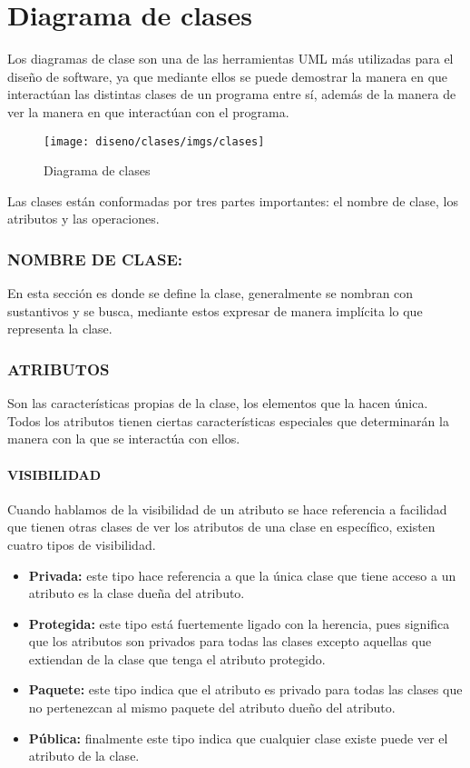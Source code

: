 \chapter{Diagrama de clases}
Los diagramas de clase son una de las herramientas UML más utilizadas para el diseño de software, ya que mediante ellos se puede demostrar la manera en que interactúan las distintas clases de un programa entre sí, además de la manera de ver la manera en que interactúan con el programa.
\begin{figure}[h!]
	\centering
	\texttt{[image: diseno/clases/imgs/clases]}
	\caption{Diagrama de clases}
\end{figure}
Las clases están conformadas por tres partes importantes: el nombre de clase, los atributos y las operaciones.

\subsection{NOMBRE DE CLASE:}
En esta sección es donde se define la clase, generalmente se nombran con sustantivos y se busca, mediante estos expresar de manera implícita lo que representa la clase.
  
\subsection{ATRIBUTOS}
Son las características propias de la clase, los elementos que la hacen única. Todos los atributos tienen ciertas características especiales que determinarán la manera con la que se interactúa con ellos.

\subsubsection{VISIBILIDAD}
Cuando hablamos de la visibilidad de un atributo se hace referencia a facilidad que tienen otras clases de ver los atributos de una clase en específico, existen cuatro tipos de visibilidad.

\begin{itemize}
	\item{\textbf{Privada:} este tipo hace referencia a que la única clase que tiene acceso a un atributo es la clase dueña del atributo.}
	\item{\textbf{Protegida:} este tipo está fuertemente ligado con la herencia, pues significa que los atributos son privados para todas las clases excepto aquellas que extiendan de la clase que tenga el atributo protegido.}
	\item{\textbf{Paquete:} este tipo indica que el atributo es privado para todas las clases que no pertenezcan al mismo paquete del atributo dueño del atributo. 	}
	\item{\textbf{Pública:} finalmente este tipo indica que cualquier clase existe puede ver el atributo de la clase.}
\end{itemize}

